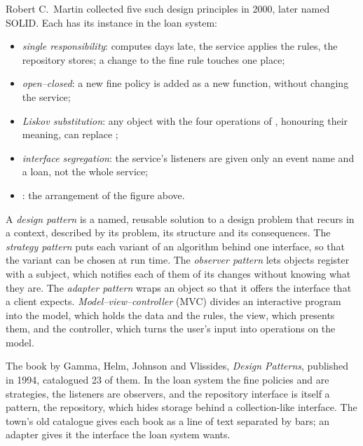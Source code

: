 Robert C.~Martin collected five such design principles in 2000, later named SOLID. %
Each has its instance in the loan system:
\begin{itemize}
  \item \emph{single responsibility}:  computes days late, the service applies the rules, the repository stores; a change to the fine rule touches one place;
  \item \emph{open--closed}: a new fine policy is added as a new function, without changing the service;
  \item \emph{Liskov substitution}: any object with the four operations of , honouring their meaning, can replace ;
  \item \emph{interface segregation}: the service's listeners are given only an event name and a loan, not the whole service;
  \item \emph{}: the arrangement of the figure above.
\end{itemize}

\begin{definition}\label{def:b3:software-engineering:patterns}
A \emph{design pattern} is a named, reusable solution to a design problem that recurs in a context, described by its problem, its structure and its consequences. The \emph{strategy pattern} puts each variant of an algorithm behind one interface, so that the variant can be chosen at run time. The \emph{observer pattern} lets objects register with a subject, which notifies each of them of its changes without knowing what they are. The \emph{adapter pattern} wraps an object so that it offers the interface that a client expects. \emph{Model--view--controller} (MVC) divides an interactive program into the model, which holds the data and the rules, the view, which presents them, and the controller, which turns the user's input into operations on the model.
\end{definition}

The book by Gamma, Helm, Johnson and Vlissides, \emph{Design Patterns}, published in 1994, catalogued 23 of them. %
In the loan system the fine policies  and  are strategies, the listeners are observers, and the repository interface is itself a pattern, the repository, which hides storage behind a collection-like interface. The town's old catalogue gives each book as a line of text separated by bars; an adapter gives it the interface the loan system wants.

